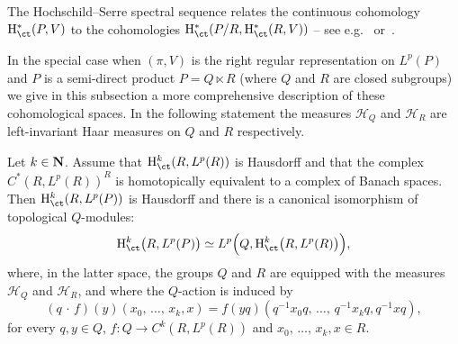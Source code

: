 The Hochschild--Serre spectral sequence relates the continuous cohomology\linebreak${\rm H}_{\ct} ^*(P, V)$ to the cohomologies ${\rm H}_{\ct} ^*(P/R, {\rm H}_{\ct} ^*(R,V))$ -- see e.g.~\cite[Chapter~IX, Theorem~4.1 p.~178]{BW} or~\cite[Proposition~5.1 p.~214]{Gui}.

In the special case when $(\pi, V)$ is the right regular representation on $L^p(P)$ and $P$ is a semi-direct product $P = Q \ltimes R$ (where $Q$ and $R$ are closed subgroups) we give in this subsection a more comprehensive description of these cohomological spaces. In the following statement the measures $\mathcal H _Q$ and $\mathcal H _R$ are left-invariant Haar measures on $Q$ and $R$ respectively.


\begin{prop}\label{spectral_prop}
Let $k \in {\bf N}$.
Assume that ${\rm H}_{\ct}^k (R, L^p(R))$ is Hausdorff and that the complex $C^*(R, L^p(R))^R$ is homotopically equivalent to a complex of Banach spaces. Then ${\rm H}_{\ct} ^k(R, L^p (P))$ is Hausdorff and there is a canonical isomorphism of topological $Q$-modules:
\[
{\rm H}_{\ct} ^k \big(R, L^p (P)\big) \simeq L^p \Bigl(Q, {\rm H}_{\ct}^k \big(R, L^p (R)\big)\Bigr),
\]
where, in the latter space, the groups $Q$ and $R$ are equipped with the measures $\mathcal H _Q$  and $\mathcal H _R$,  and where the $Q$-action is induced by
\[
(q\,\cdot\,f)(y)(x_0,\,\dots,\,x_k, x) = f(yq)\left(q^{-1} x_0 q,\,\dots,\,q^{-1} x_k q, q^{-1} x q\right),
\]
for every $q, y \in Q$, $f : Q \to C^k (R, L^p(R))$ and $x_0,\,\dots,\,x_k, x \in R$.

\end{prop}

